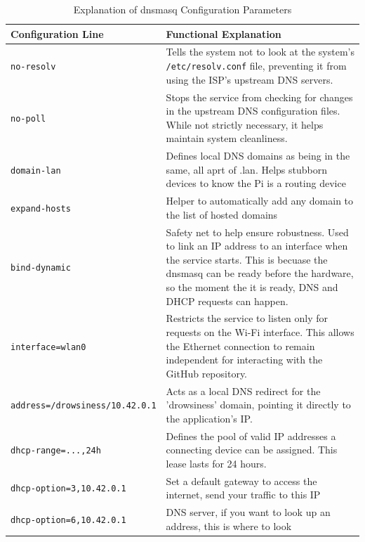 \begin{table}[H]
\centering
\caption{Explanation of dnsmasq Configuration Parameters}
\label{tab:dnsmasq_explained}
\begin{tabularx}{\textwidth}{|l|X|}
\hline
\textbf{Configuration Line} & \textbf{Functional Explanation} \\ \hline
\texttt{no-resolv} & Tells the system not to look at the system's \texttt{/etc/resolv.conf} file, preventing it from using the ISP's
upstream DNS servers. \\ \hline
\texttt{no-poll} & Stops the service from checking for changes in the upstream DNS configuration files. While not strictly necessary,
it helps maintain system cleanliness. \\ \hline
\texttt{domain-lan} & Defines local DNS domains as being in the same, all aprt of .lan. Helps stubborn devices to know the Pi is a routing device\\ \hline
\texttt{expand-hosts} & Helper to automatically add any domain to the list of hosted domains\\ \hline
\texttt{bind-dynamic} & Safety net to help ensure robustness. Used to link an IP address to an interface when the service starts. This
is becuase the dnsmasq can be ready before the hardware, so the moment the it is ready, DNS and DHCP requests can happen. \\ \hline
\texttt{interface=wlan0} & Restricts the service to listen only for requests on the Wi-Fi interface. This allows the Ethernet connection
to remain independent for interacting with the GitHub repository. \\ \hline
\texttt{address=/drowsiness/10.42.0.1} & Acts as a local DNS redirect for the 'drowsiness' domain, pointing it directly to the
application's IP. \\ \hline
\texttt{dhcp-range=...,24h} & Defines the pool of valid IP addresses a connecting device can be assigned. This lease lasts for 24 hours. \\ \hline
\texttt{dhcp-option=3,10.42.0.1} & Set a default gateway to access the internet, send your traffic to this IP \\ \hline
\texttt{dhcp-option=6,10.42.0.1} & DNS server, if you want to look up an address, this is where to look \\ \hline
\end{tabularx}
\end{table}

